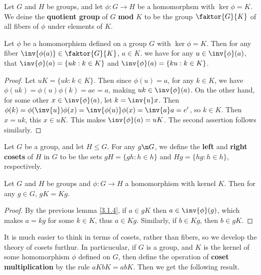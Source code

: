 \begin{definition}
    Let $G$ and  $H$ be groups, and let  $\phi:G \rightarrow H$ be a homomorphsm
    with $\ker{\phi}=K$. We deine the \textbf{quotient group} of $G$
    \textbf{mod} $K$ to be the group $\faktor{G}{K}$ of all fibers of $\phi$
    under elements of $K$.
\end{definition}

\begin{lemma}\label{3.1.4}
    Let $\phi$ be a homomorphism defined on a group  $G$ with  $\ker{\phi}=K$.
    Then for any fiber $\inv{\phi(a)} \in \faktor{G}{K}$, $a \in K$. we have
    for any $u \in \inv{\phi}(a)$, that $\inv{\phi}(a)=\{uk : k \in K\}$ and
    $\inv{\phi}(a)=\{ku : k \in K\}$.
\end{lemma}
\begin{proof}
    Let $uK=\{uk : k \in K\}$. Then since $\phi(u)=a$, for any $k \in K$, we
    have  $\phi(uk)=\phi(u)\phi(k)=ae=a$, making $uk \in \inv {\phi}(a)$. On the
    other hand, for some other $x \in \inv{\phi}(a)$, let $k=\inv{u}x$. Then
     $\phi(k)=\phi(\inv{u})\phi(x)=\inv{\phi(u)}\phi(x)=\inv{a}a=e'$, so $k \in
     K$. Then  $x=uk$, this  $x \in uK$. This makes  $\inv{\phi}(a)=uK$. The
     second assertion follows similarly.
\end{proof}

\begin{definition}
    Let $G$ be a group, and let  $H \leq G$. For any  $g \n G$, we define the
     \textbf{left} and \textbf{right cosets} of $H$ in $G$ to be the sets
     $gH=\{gh : h \in h\}$ and $Hg=\{hg : h \in h\}$, respectively.
\end{definition}

\begin{lemma}\label{3.1.5}
    Let $G$ and  $H$ be groups and  $\phi:G \rightarrow H$ a homomorphism with
    kernel $K$. Then for any  $g \in G$,  $gK=Kg$.
\end{lemma}
\begin{proof}
    By the previous lemma \ref{3.1.4}, if $a \in gK$ then  $a \in \inv{\phi}(g)$,
    which makes $a=kg$ for some  $k \in K$, thus  $a \in Kg$. Similarly, if  $b
    \in Kg$, then  $b \in gK$.
\end{proof}

It is much easier to think in terms of cosets, rather than fibers, so we develop
the theory of cosets furthur. In particucular, if $G$ is a group, and  $K$ is
the kernel of some homomorphism  $\phi$ defined on  $G$, then define the
operation of  \textbf{coset multiplication} by the rule $aKbK=abK$. Then we get
the following result.

